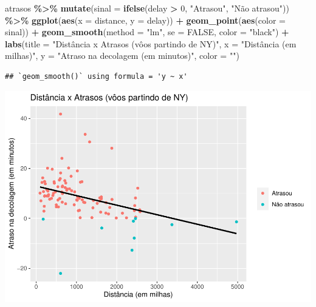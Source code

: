 \documentclass[
]{book}
\newenvironment{Shaded}{\begin{snugshade}}{\end{snugshade}}
\newcommand{\AttributeTok}[1]{\textcolor[rgb]{0.13,0.29,0.53}{#1}}
\newcommand{\ConstantTok}[1]{\textcolor[rgb]{0.56,0.35,0.01}{#1}}
\newcommand{\DecValTok}[1]{\textcolor[rgb]{0.00,0.00,0.81}{#1}}
\newcommand{\FunctionTok}[1]{\textcolor[rgb]{0.13,0.29,0.53}{\textbf{#1}}}
\newcommand{\NormalTok}[1]{#1}
\newcommand{\SpecialCharTok}[1]{\textcolor[rgb]{0.81,0.36,0.00}{\textbf{#1}}}
\newcommand{\StringTok}[1]{\textcolor[rgb]{0.31,0.60,0.02}{#1}}
\begin{document}
\begin{Shaded}
\begin{Highlighting}[]
\NormalTok{atrasos }\SpecialCharTok{\%\textgreater{}\%} 
  \FunctionTok{mutate}\NormalTok{(}\AttributeTok{sinal =} \FunctionTok{ifelse}\NormalTok{(delay }\SpecialCharTok{\textgreater{}} \DecValTok{0}\NormalTok{, }\StringTok{"Atrasou"}\NormalTok{, }\StringTok{"Não atrasou"}\NormalTok{)) }\SpecialCharTok{\%\textgreater{}\%}
  \FunctionTok{ggplot}\NormalTok{(}\FunctionTok{aes}\NormalTok{(}\AttributeTok{x =}\NormalTok{ distance, }\AttributeTok{y =}\NormalTok{ delay)) }\SpecialCharTok{+}
  \FunctionTok{geom\_point}\NormalTok{(}\FunctionTok{aes}\NormalTok{(}\AttributeTok{color =}\NormalTok{ sinal)) }\SpecialCharTok{+}
  \FunctionTok{geom\_smooth}\NormalTok{(}\AttributeTok{method =} \StringTok{"lm"}\NormalTok{,}
              \AttributeTok{se =} \ConstantTok{FALSE}\NormalTok{,}
              \AttributeTok{color =} \StringTok{"black"}\NormalTok{) }\SpecialCharTok{+}
  \FunctionTok{labs}\NormalTok{(}\AttributeTok{title =} \StringTok{"Distância x Atrasos (vôos partindo de NY)"}\NormalTok{,}
       \AttributeTok{x =} \StringTok{"Distância (em milhas)"}\NormalTok{,}
       \AttributeTok{y =} \StringTok{"Atraso na decolagem (em minutos)"}\NormalTok{,}
       \AttributeTok{color =} \StringTok{""}\NormalTok{)}
\end{Highlighting}
\end{Shaded}

\begin{verbatim}
## `geom_smooth()` using formula = 'y ~ x'
\end{verbatim}

\includegraphics{AprendendoR_files/figure-latex/unnamed-chunk-62-1.pdf}
\end{document}

